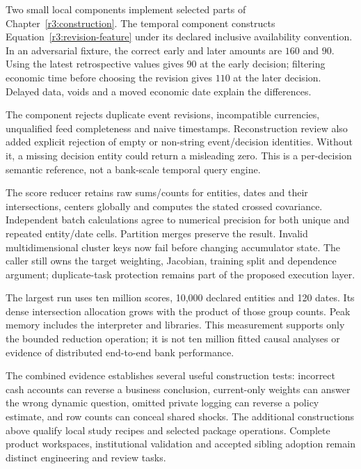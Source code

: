 Two small local components implement selected parts of
Chapter~\ref{r3:construction}. The temporal component constructs
Equation~\eqref{r3:revision-feature} under its declared inclusive
availability convention. In an adversarial fixture, the correct
early and later amounts are $160$ and $90$. Using the latest
retrospective values gives $90$ at the early decision; filtering
economic time before choosing the revision gives $110$ at the later
decision. Delayed data, voids and a moved economic date explain the
differences.

The component rejects duplicate event revisions, incompatible currencies,
unqualified feed completeness and naive timestamps. Reconstruction review
also added explicit rejection of empty or non-string event/decision
identities. Without it, a missing decision entity could return a
misleading zero. This is a per-decision semantic reference, not a
bank-scale temporal query engine.

The score reducer retains raw sums/counts for entities, dates and their
intersections, centers globally and computes the stated crossed
covariance. Independent batch calculations agree to numerical precision
for both unique and repeated entity/date cells. Partition merges preserve
the result. Invalid multidimensional cluster keys now fail before
changing accumulator state. The caller still owns the target weighting,
Jacobian, training split and dependence argument; duplicate-task
protection remains part of the proposed execution layer.

\begin{table}[htbp]\centering\small

\caption{Median of three fresh processes at each size on the recorded host.
The workload generates and reduces precomputed two-dimensional scores;
it excludes source I/O, history reconstruction and model fitting.}
\label{r3:scale-measurement}
\end{table}

The largest run uses ten million scores, 10,000 declared entities and
120 dates. Its dense intersection allocation grows with the product
of those group counts. Peak memory includes the interpreter and
libraries. This measurement supports only the bounded reduction
operation; it is not ten million fitted causal analyses or evidence
of distributed end-to-end bank performance.

The combined evidence establishes several useful construction tests:
incorrect cash accounts can reverse a business conclusion, current-only
weights can answer the wrong dynamic question, omitted private logging
can reverse a policy estimate, and row counts can conceal shared shocks.
The additional constructions above qualify local study recipes and selected
package operations. Complete product workspaces, institutional validation
and accepted sibling adoption remain distinct engineering and review tasks.





